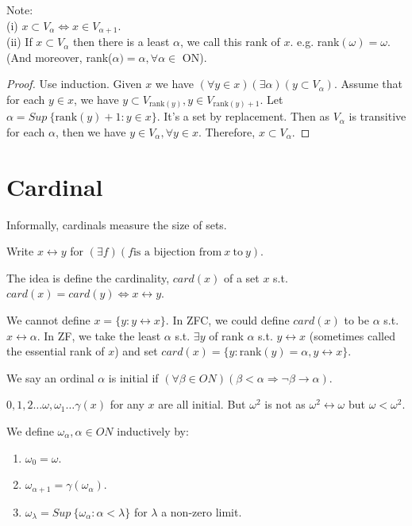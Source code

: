 Note:\\
(i) $x \subset V_\alpha \iff x \in V_{\alpha+1}$.\\
(ii) If $x \subset V_\alpha$ then there is a least $\alpha$, we call this rank of $x$. e.g. rank$(\omega)=\omega$. (And moreover, rank($\alpha)=\alpha, \forall \alpha \in$ ON).
\begin{proof} Use induction. Given $x$ we have $(\forall y \in x)(\exists \alpha)(y \subset V_\alpha)$. Assume that for each $y \in x$, we have $y \subset V_{\text{rank}(y)}, y \in V_{\text{rank}(y)+1}$. Let $\alpha= Sup~\{\text{rank}(y) + 1: y \in x\}$. It's a set by replacement. Then as $V_\alpha$ is transitive for each $\alpha$, then we have $y \in V_\alpha, \forall y \in x$. Therefore, $x \subset V_\alpha$.
\end{proof}
\section{Cardinal}
Informally, cardinals measure the size of sets.
\begin{definition} Write $x \leftrightarrow y$ for $(\exists f)(f \text{is a bijection from}~x~ \text{to} ~y)$.
\end{definition}
The idea is define the cardinality, $card(x)$ of a set $x$ s.t. $card(x)=card(y) \iff x \leftrightarrow y$.
\begin{remark} We cannot define $x=\{y: y \leftrightarrow x\}$. In ZFC, we could define $card(x)$ to be $\alpha$ s.t. $x \leftrightarrow \alpha$. In ZF, we take the least $\alpha$ s.t. $\exists y$ of rank $\alpha$ s.t. $y \leftrightarrow x$ (sometimes called the essential rank of $x$) and set $card(x)=\{y: $rank$(y)=\alpha, y \leftrightarrow x\}$.
\end{remark}
\begin{definition} We say an ordinal $\alpha$ is initial if $(\forall \beta \in ON)(\beta < \alpha \Rightarrow \neg \beta \rightarrow \alpha)$.
\end{definition}
\begin{example} $0,1,2 \ldots \omega, \omega_1 \ldots \gamma(x)$ for any $x$ are all initial. But $\omega^2$ is not as $\omega^2 \leftrightarrow \omega$ but $\omega < \omega^2$.
\end{example}
\begin{definition}
We define $\omega_\alpha, \alpha \in ON$ inductively by:
\begin{enumerate}
\item $\omega_0=\omega$.\\
\item $\omega_{\alpha+1}=\gamma(\omega_\alpha)$.\\
\item $\omega_\lambda=Sup~\{\omega_\alpha: \alpha < \lambda\}$ for $\lambda$ a non-zero limit.
\end{enumerate}
\end{definition}
